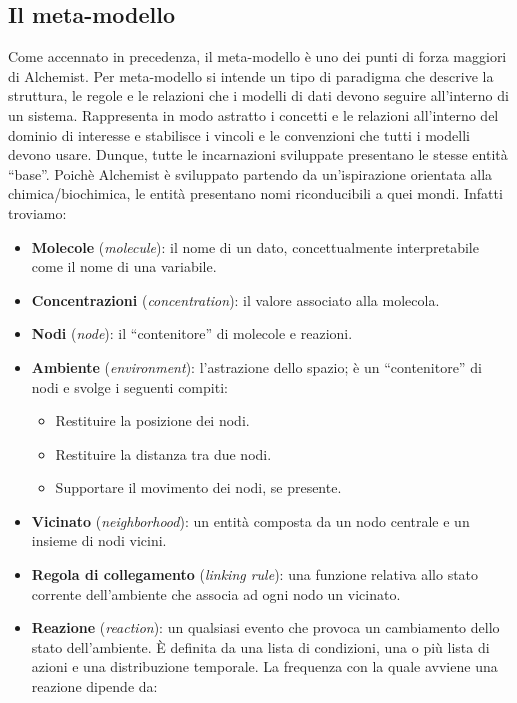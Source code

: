 \documentclass[12pt,a4paper,openright,twoside]{book}
\begin{document}
\subsection{Il meta-modello} 
Come accennato in precedenza, il meta-modello è uno dei punti di forza maggiori di Alchemist. 
Per meta-modello si intende un tipo di paradigma che descrive la struttura, le regole e le relazioni
che i modelli di dati devono seguire all'interno di un sistema. Rappresenta in modo astratto i 
concetti e le relazioni all'interno del dominio di interesse e stabilisce i vincoli e le convenzioni
che tutti i modelli devono usare. Dunque, tutte le incarnazioni sviluppate presentano le stesse entità
``base''. Poichè Alchemist è sviluppato partendo da un'ispirazione orientata alla chimica/biochimica,
le entità presentano nomi riconducibili a quei mondi. Infatti troviamo:
\begin{itemize}
    \item \textbf{Molecole} (\textit{molecule}): il nome di un dato, concettualmente interpretabile come il nome di una variabile.
    \item \textbf{Concentrazioni} (\textit{concentration}): il valore associato alla molecola.
    \item \textbf{Nodi} \label{node} (\textit{node}): il ``contenitore'' di molecole e reazioni.
    \item \textbf{Ambiente} (\textit{environment}): l'astrazione dello spazio; è un “contenitore” di nodi e svolge i seguenti compiti:
    \begin{itemize}
        \item Restituire la posizione dei nodi.
        \item Restituire la distanza tra due nodi.
        \item Supportare il movimento dei nodi, se presente.
    \end{itemize}
    \item \textbf{Vicinato} (\textit{neighborhood}): un entità composta da un nodo centrale e un insieme di nodi vicini.
    \item \textbf{Regola di collegamento} (\textit{linking rule}): una funzione relativa allo stato corrente dell'ambiente che associa ad ogni nodo un vicinato.
    \item \textbf{Reazione} (\textit{reaction}): un qualsiasi evento che provoca un cambiamento dello stato dell'ambiente. È definita da una lista di condizioni, una o più lista di azioni e una distribuzione temporale. La frequenza con la quale avviene una reazione dipende da:

\end{itemize}
\end{document}
